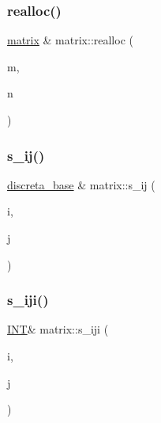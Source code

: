 \subsubsection{\texorpdfstring{realloc()}{realloc()}}
{\footnotesize\ttfamily \mbox{\hyperlink{classmatrix}{matrix}} \& matrix\+::realloc (\begin{DoxyParamCaption}\item[{\mbox{\hyperlink{galois_8h_a09fddde158a3a20bd2dcadb609de11dc}{I\+NT}}}]{m,  }\item[{\mbox{\hyperlink{galois_8h_a09fddde158a3a20bd2dcadb609de11dc}{I\+NT}}}]{n }\end{DoxyParamCaption})}

\mbox{\label{classmatrix_ab36f1b3abd2df280224c50c9debb57df}} 
\subsubsection{\texorpdfstring{s\+\_\+ij()}{s\_ij()}}
{\footnotesize\ttfamily \mbox{\hyperlink{classdiscreta__base}{discreta\+\_\+base}} \& matrix\+::s\+\_\+ij (\begin{DoxyParamCaption}\item[{\mbox{\hyperlink{galois_8h_a09fddde158a3a20bd2dcadb609de11dc}{I\+NT}}}]{i,  }\item[{\mbox{\hyperlink{galois_8h_a09fddde158a3a20bd2dcadb609de11dc}{I\+NT}}}]{j }\end{DoxyParamCaption})}

\mbox{\label{classmatrix_af8d3c35817af62a3c0097ddf64422d96}} 
\subsubsection{\texorpdfstring{s\+\_\+iji()}{s\_iji()}}
{\footnotesize\ttfamily \mbox{\hyperlink{galois_8h_a09fddde158a3a20bd2dcadb609de11dc}{I\+NT}}\& matrix\+::s\+\_\+iji (\begin{DoxyParamCaption}\item[{\mbox{\hyperlink{galois_8h_a09fddde158a3a20bd2dcadb609de11dc}{I\+NT}}}]{i,  }\item[{\mbox{\hyperlink{galois_8h_a09fddde158a3a20bd2dcadb609de11dc}{I\+NT}}}]{j }\end{DoxyParamCaption})\hspace{0.3cm}{\ttfamily [inline]}}


